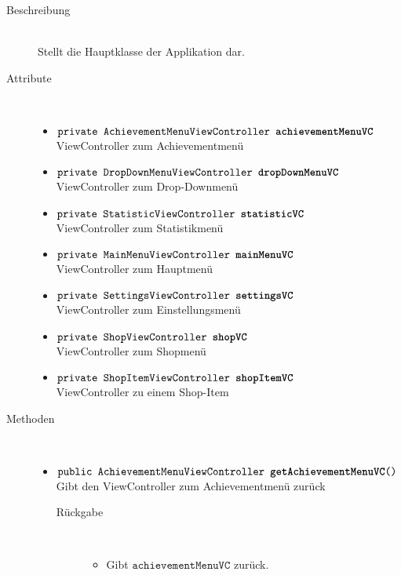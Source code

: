 \begin{description}
\item[Beschreibung] \hfill \\ Stellt die Hauptklasse der Applikation dar.

\item[Attribute] \hfill \\
	\vspace{-.8cm}
	\begin{itemize}
		\item $\texttt{private AchievementMenuViewController \textbf{achievementMenuVC}}$ \\ ViewController zum Achievementmenü
		\item $\texttt{private DropDownMenuViewController \textbf{dropDownMenuVC}}$ \\ ViewController zum Drop-Downmenü
		\item $\texttt{private StatisticViewController \textbf{statisticVC}}$ \\ ViewController zum Statistikmenü
		\item $\texttt{private MainMenuViewController \textbf{mainMenuVC}}$ \\ ViewController zum Hauptmenü
		\item $\texttt{private SettingsViewController \textbf{settingsVC}}$ \\ ViewController zum Einstellungsmenü
		\item $\texttt{private ShopViewController \textbf{shopVC}}$ \\ ViewController zum Shopmenü
		\item $\texttt{private ShopItemViewController \textbf{shopItemVC}}$ \\ ViewController zu einem Shop-Item
		
		\end{itemize}
	
	
\item[Methoden] \hfill \\
	\vspace{-.8cm}
	\begin{itemize}
		\item $\texttt{public AchievementMenuViewController \textbf{getAchievementMenuVC}()}$ \\ Gibt den ViewController zum Achievementmenü zurück
		\begin{description}
			\item[Rückgabe] \hfill \\
			\vspace{-.8cm}
			\begin{itemize}
				\item Gibt $\texttt{achievementMenuVC}$ zurück.
			\end{itemize}
			\end{description}
		

\end{itemize}
\end{description}
